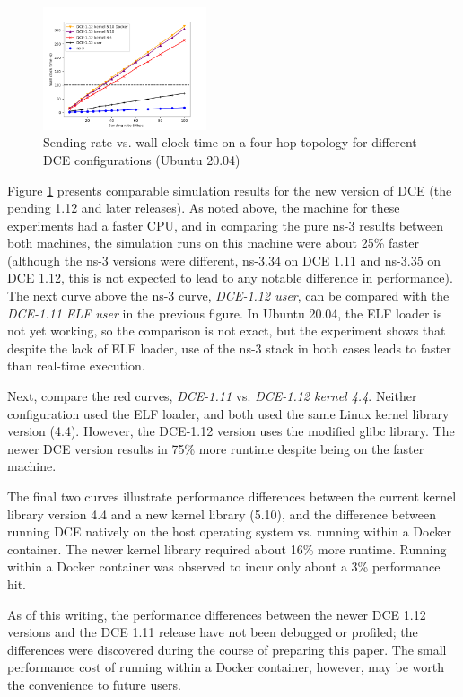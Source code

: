 \documentclass{sig-alternate}
\begin{document}
\begin{figure}[h!]
  \centering
    \includegraphics[width=0.43\textwidth]{figs/rate-vs-time-dce12.png}
  \caption{Sending rate vs. wall clock time on a four hop topology for different DCE configurations (Ubuntu 20.04)}
  \label{fig:rate-vs-time-u20}
\end{figure}

Figure \ref{fig:rate-vs-time-u20} presents comparable simulation results
for the new version of DCE (the pending 1.12 and later releases).  As noted
above, the machine for these experiments had a faster CPU, and in comparing
the pure ns-3 results between both machines, the simulation runs on this
machine were about 25\% faster (although the ns-3 versions were different,
ns-3.34 on DCE 1.11 and ns-3.35 on DCE 1.12, this is not expected to
lead to any notable difference in performance).  The next curve above
the ns-3 curve, \emph{DCE-1.12 user}, can be compared with the
\emph{DCE-1.11 ELF user} in the previous figure.  In Ubuntu 20.04, the
ELF loader is not yet working, so the comparison is not exact, but the
experiment shows that despite the lack of ELF loader, use of the ns-3
stack in both cases leads to faster than real-time execution.

Next, compare the red curves, \emph{DCE-1.11} vs. \emph{DCE-1.12 kernel 4.4}.
Neither configuration used the ELF loader, and both used the same Linux
kernel library version (4.4).  However, the DCE-1.12 version uses the
modified glibc library.  The newer DCE version results in 75\% more runtime
despite being on the faster machine.  

The final two curves illustrate performance differences between the current
kernel library version 4.4 and a new kernel library (5.10), and the
difference between running DCE natively on the host operating system vs.
running within a Docker container.  The newer kernel library required
about 16\% more runtime.   Running within a Docker container was observed
to incur only about a 3\% performance hit.

As of this writing, the performance differences between the newer DCE 1.12
versions and the DCE 1.11 release have not been debugged
or profiled; the differences were discovered during the course of preparing
this paper.  The small performance cost of running within a Docker container,
however, may be worth the convenience to future users.
\end{document}

